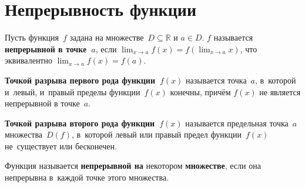 \section{Непрерывность функции}
 Пусть функция~$f$ задана на множестве~$D \subseteq \mathbb R$ и $a \in D$.
$f$ называется \textbf{непрерывной в точке~$a$}, если $\displaystyle \lim_{x \to a} f(x) = f(\lim_{x \to a} x)$, что эквивалентно $\displaystyle \lim_{x \to a} f(x) = f(a)$.

 \textbf{Точкой разрыва первого рода функции~$f(x)$} называется точка~$a$, в~которой и~левый, и~правый пределы функции~$f(x)$ конечны, причём $f(x)$ не является непрерывной в точке~$a$.

\textbf{Точкой разрыва второго рода функции~$f(x)$} называется предельная точка~$a$ множества~$D(f)$, в~которой левый или правый предел функции~$f(x)$ не~существует или бесконечен.

Функция называется \textbf{непрерывной на} некотором \textbf{множестве}, если она непрерывна в~каждой точке этого множества.